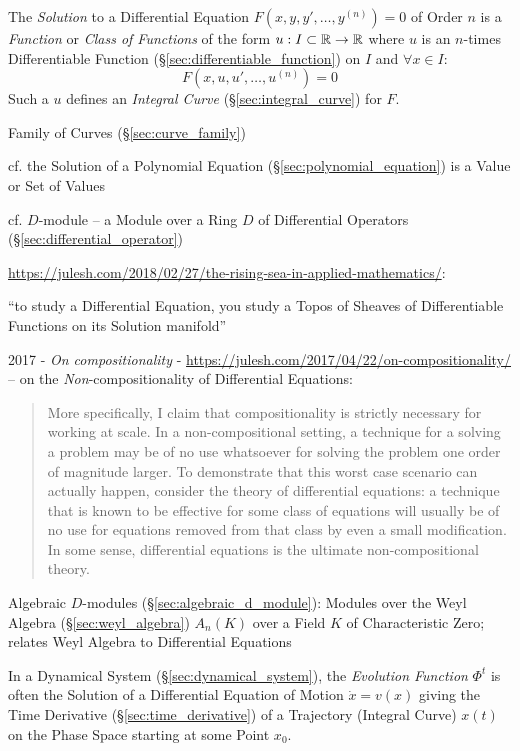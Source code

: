 \asterism

The \emph{Solution} to a Differential Equation $F(x,y,y',\ldots,y^{(n)}) = 0$
of Order $n$ is a \emph{Function} or \emph{Class of Functions} of the form $u :
I \subset \mathbb{R} \rightarrow \mathbb{R}$ where $u$ is an $n$-times Differentiable
Function (\S\ref{sec:differentiable_function}) on $I$ and $\forall x \in I$:
\[
  F(x,u,u',\ldots,u^{(n)}) = 0
\]
Such a $u$ defines an \emph{Integral Curve} (\S\ref{sec:integral_curve}) for
$F$.

\fist Family of Curves (\S\ref{sec:curve_family})

\fist cf. the Solution of a Polynomial Equation
(\S\ref{sec:polynomial_equation}) is a Value or Set of Values

\fist cf. $D$-module -- a Module over a Ring $D$ of Differential Operators
(\S\ref{sec:differential_operator})

\url{https://julesh.com/2018/02/27/the-rising-sea-in-applied-mathematics/}:

``to study a Differential Equation, you study a Topos of Sheaves of
Differentiable Functions on its Solution manifold''

2017 - \emph{On compositionality} -
\url{https://julesh.com/2017/04/22/on-compositionality/} --
on the \emph{Non}-compositionality of Differential Equations:
\begin{quote}
  More specifically, I claim that compositionality is strictly necessary
  for working at scale. In a non-compositional setting, a technique for a
  solving a problem may be of no use whatsoever for solving the problem one
  order of magnitude larger. To demonstrate that this worst case scenario can
  actually happen, consider the theory of differential equations: a technique
  that is known to be effective for some class of equations will usually be of
  no use for equations removed from that class by even a small modification. In
  some sense, differential equations is the ultimate non-compositional theory.
\end{quote}

\fist Algebraic $D$-modules (\S\ref{sec:algebraic_d_module}): Modules over the
Weyl Algebra (\S\ref{sec:weyl_algebra}) $A_n(K)$ over a Field $K$ of
Characteristic Zero; relates Weyl Algebra to Differential Equations

In a Dynamical System (\S\ref{sec:dynamical_system}), the \emph{Evolution
  Function} $\Phi^t$ is often the Solution of a Differential Equation of Motion
$\dot{x} = v(x)$ giving the Time Derivative (\S\ref{sec:time_derivative}) of a
Trajectory (Integral Curve) $x(t)$ on the Phase Space starting at some Point
$x_0$.

